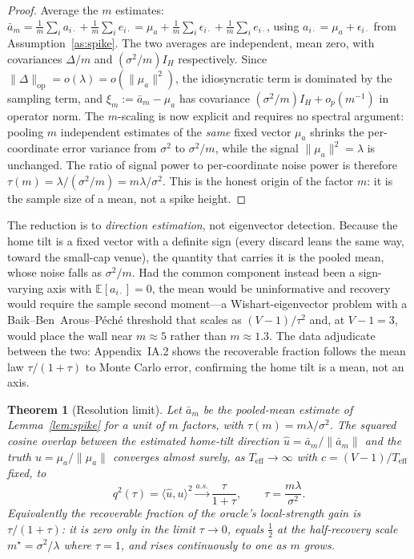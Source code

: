 \documentclass[12pt]{article}
\theoremstyle{plain}
\newtheorem{theorem}{Theorem}
\theoremstyle{definition}
\newcommand{\E}{\mathbb{E}}
\begin{document}
\begin{proof}
Average the $m$ estimates:
$\bar a_m=\tfrac1m\sum_i a_{i\cdot}+\tfrac1m\sum_i e_{i\cdot}
=\mu_a+\tfrac1m\sum_i\epsilon_{i\cdot}+\tfrac1m\sum_i e_{i\cdot}$,
using $a_{i\cdot}=\mu_a+\epsilon_{i\cdot}$ from Assumption~\ref{as:spike}. The two
averages are independent, mean zero, with covariances $\Delta/m$ and
$(\sigma^2/m)I_H$ respectively. Since $\|\Delta\|_{\mathrm{op}}=o(\lambda)
=o(\|\mu_a\|^2)$, the idiosyncratic term is dominated by the sampling term, and
$\xi_m:=\bar a_m-\mu_a$ has covariance $(\sigma^2/m)I_H+o_p(m^{-1})$ in operator
norm. The $m$-scaling is now explicit and requires no spectral argument: pooling
$m$ independent estimates of the \emph{same} fixed vector $\mu_a$ shrinks the
per-coordinate error variance from $\sigma^2$ to $\sigma^2/m$, while the signal
$\|\mu_a\|^2=\lambda$ is unchanged. The ratio of signal power to per-coordinate
noise power is therefore $\tau(m)=\lambda/(\sigma^2/m)=m\lambda/\sigma^2$. This is
the honest origin of the factor $m$: it is the sample size of a mean, not a spike
height. \qedhere
\end{proof}

\noindent The reduction is to \emph{direction estimation}, not eigenvector
detection. Because the home tilt is a fixed vector with a definite sign (every
discard leans the same way, toward the small-cap venue), the quantity that
carries it is the pooled mean, whose noise falls as $\sigma^2/m$. Had the common
component instead been a sign-varying axis with $\E[a_{i\cdot}]=0$, the mean would
be uninformative and recovery would require the sample second moment---a
Wishart-eigenvector problem with a Baik--Ben~Arous--P\'ech\'e threshold that
scales as $(V-1)/\tau^2$ and, at $V-1=3$, would place the wall near $m\approx5$
rather than $m\approx1.3$. The data adjudicate between the two: Appendix~IA.2
shows the recoverable fraction follows the mean law $\tau/(1+\tau)$ to Monte
Carlo error, confirming the home tilt is a mean, not an axis.

\begin{theorem}[Resolution limit]
\label{thm:bbp}
Let $\bar a_m$ be the pooled-mean estimate of Lemma~\ref{lem:spike} for a unit of
$m$ factors, with $\tau(m)=m\lambda/\sigma^2$. The squared cosine overlap between
the estimated home-tilt direction $\hat u=\bar a_m/\|\bar a_m\|$ and the truth
$u=\mu_a/\|\mu_a\|$ converges almost surely, as $T_{\text{eff}}\to\infty$ with
$c=(V-1)/T_{\text{eff}}$ fixed, to
\[
q^2(\tau)=\langle\hat u,u\rangle^2\xrightarrow{a.s.}\frac{\tau}{1+\tau},
\qquad \tau=\frac{m\lambda}{\sigma^2}.
\]
Equivalently the recoverable fraction of the oracle's local-strength gain is
$\tau/(1+\tau)$: it is zero only in the limit $\tau\to0$, equals $\tfrac12$ at the
half-recovery scale $m^\star=\sigma^2/\lambda$ where $\tau=1$, and rises
continuously to one as $m$ grows.
\end{theorem}
\end{document}
